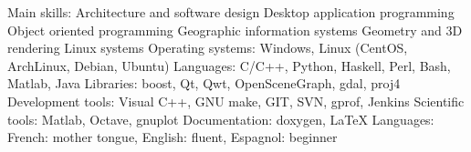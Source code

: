 \begin{cvskills}
  \cvskill
    {Main skills:}
 	{
		Architecture and software design\newline
		Desktop application programming\newline
        Object oriented programming\newline
        Geographic information systems\newline
        Geometry and 3D rendering\newline
        Linux systems
	}
  \cvskill
    {Operating systems:}
 	{Windows, Linux (CentOS, ArchLinux, Debian, Ubuntu)}
  \cvskill
    {Languages:}
 	{C/C++, Python, Haskell, Perl, Bash, Matlab, Java}
  \cvskill
    {Libraries:}
 	{boost, Qt, Qwt, OpenSceneGraph, gdal, proj4}
  \cvskill
	{Development tools:}
	{Visual C++, GNU make, GIT, SVN, gprof, Jenkins}
  \cvskill
	{Scientific tools:}
	{Matlab, Octave, gnuplot}
  \cvskill
	{Documentation:}
	{doxygen, \LaTeX}
  \cvskill
    {Languages:}
 	{
        French: mother tongue,
		English: fluent,
		Espagnol: beginner
	}
\end{cvskills}


